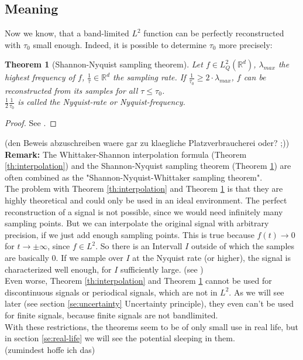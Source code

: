 \documentclass[a4paper, 11pt]{scrreprt}
\newtheorem{theorem}[defi]{Theorem}
\newcommand{\RR}{\mathbb{R}}
\begin{document}
\subsection{Meaning}

Now we know, that a band-limited \(L^2\) function can be perfectly reconstructed with \(\tau_0\) small enough. Indeed, it is possible to determine \(\tau_0\) more precisely:
\begin{theorem}[Shannon-Nyquist sampling theorem]
\label{th:sampling}
Let \(f\in L^2_Q(\RR^d)\), \(\lambda_{max}\) the highest frequency of \(f\), \(\frac{1}{\tau}\in \RR^d\) the sampling rate. If \(\frac{1}{\tau_0} \geq 2\cdot \lambda_{max}\), \(f\) can be reconstructed from its samples for all \(\tau \leq \tau_0\).\\
\(\frac 1 2 \frac{1}{\tau_0}\) is called the Nyquist-rate or Nyquist-frequency.
\end{theorem} 
\begin{proof}
See \cite{shannon01}.
\end{proof}
(den Beweis abzuschreiben waere gar zu klaegliche Platzverbraucherei oder? ;))\\
\textbf{Remark:} The Whittaker-Shannon interpolation formula (Theorem  \ref{th:interpolation}) and the Shannon-Nyquist sampling theorem (Theorem \ref{th:sampling}) are often combined as the "Shannon-Nyquist-Whittaker sampling theorem".\\
The problem with Theorem  \ref{th:interpolation} and Theorem \ref{th:sampling} is that they are highly theoretical and could only be used in an ideal environment. The perfect reconstruction of a signal is not possible, since we would need infinitely many sampling points. But we can interpolate the original signal with arbitrary precision, if we just add enough sampling points. This is true because \(f(t)\to 0\) for \(t\to\pm\infty\), since \(f\in L^2\). So there is an Intervall \(I\) outside of which the samples are basically 0. If we sample over \(I\) at the Nyquist rate (or higher), the signal is characterized well enough, for \(I\) sufficiently large. (see \cite{marks02})\\
Even worse, Theorem  \ref{th:interpolation} and Theorem \ref{th:sampling} cannot be used for discontinuous signals or periodical signals, which are not in \(L^2\). As we will see later (see section \ref{se:uncertainty} Uncertainty principle), they even can't be used for finite signals, because finite signals are not bandlimited. \\
With these restrictions, the theorems seem to be of only small use in real life, but in section \ref{se:real-life} we will see the potential sleeping in them.\\
(zumindest hoffe ich das)
\end{document}

